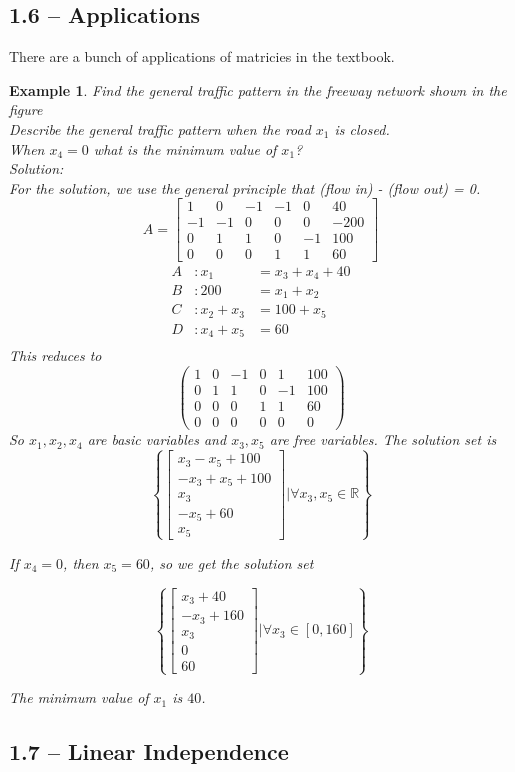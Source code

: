 \documentclass[11pt]{article}
\newtheorem{ex}{Example}
\begin{document}
\subsection{1.6 -- Applications}
There are a bunch of applications of matricies in the textbook.
\begin{ex}
  Find the general traffic pattern in the freeway network shown in the figure \\
  Describe the general traffic pattern when the road $x_{1}$ is closed. \\
  When $x_{4} = 0$ what is the minimum value of $x_{1}$? \\
  Solution:\\
  For the solution, we use the general principle that (flow in) - (flow out) = 0.
  \[A = \begin{bmatrix} 1 & 0 & -1 & -1 & 0 & 40 \\
          -1 & -1 & 0 & 0 & 0 & -200 \\
          0 & 1 & 1 & 0 & -1 & 100 \\
          0 & 0 & 0 & 1 & 1 & 60\end{bmatrix}\]
\begin{align*}
  A &: x_{1} &= x_{3} + x_{4} + 40\\
  B &: 200 &= x_{1} + x_{2} \\
  C &: x_{2} + x_{3} &= 100 + x_{5} \\
  D &: x_{4} + x_{5} &= 60 \\
\end{align*}
This reduces to
\[\left(\begin{array}{rrrrrr}
1 & 0 & -1 & 0 & 1 & 100 \\
0 & 1 & 1 & 0 & -1 & 100 \\
0 & 0 & 0 & 1 & 1 & 60 \\
0 & 0 & 0 & 0 & 0 & 0
\end{array}\right)\]
So $x_{1}, x_{2}, x_{4}$ are basic variables and $x_{3}, x_{5}$ are free variables. The solution set is
\[\left\{\begin{bmatrix} x_{3} - x_{5} + 100 \\ -x_{3} + x_{5} + 100 \\ x_{3} \\-x_{5} + 60 \\ x_{5}\end{bmatrix} | \forall x_{3}, x_{5} \in \mathbb{R}\right\}\]

If $x_{4} = 0$, then $x_{5} = 60$, so we get the solution set

\[\left\{\begin{bmatrix} x_{3} +40 \\ -x_{3} +   160 \\ x_{3} \\ 0  \\ 60\end{bmatrix} | \forall x_{3} \in [0, 160]\right\}\]

The minimum value of $x_{1}$ is $40$.
\subsection{1.7 -- Linear Independence}
\end{ex}
\end{document}
